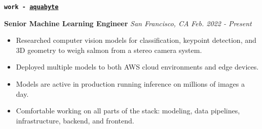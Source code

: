 \documentclass{article}[14pt]
\newenvironment{cvsection}[2] {
  \begin{tcolorbox}[
    standard jigsaw, %
    opacityback=0,   %
    top=0mm,         %
    bottom=0mm,      %
    boxrule=0pt,     %
    enhanced,        %
    frame code={
      \path[draw=#2,line width=3pt]
        (frame.south west) --
        ([yshift=-0.29cm] frame.north west) --
        ([yshift=-0.29cm, xshift=0.2\linewidth] frame.north west);
    }
  ]
  \hspace{0.20\linewidth}
  \textbf{\texttt{\Large{#1}}}
  \large
  \vspace{5pt}
  \newline
}
{ \end{tcolorbox} }
\newenvironment{tightemize}
{\vspace{-2pt}\begin{itemize}[leftmargin=*]\itemsep4pt \parskip0pt \parsep0pt}
{\end{itemize}}
\newcommand{\header}[1]{{\large\textbf{#1}}\newline}
\newcommand{\locationdate}[2]{\textit{#1} \hfill \textit{#2}}
\begin{document}
\vspace{1pt}
\begin{cvsection}{work - \href{https://aquabyte.ai/}{aquabyte}}{C1}
  \header{ Senior Machine Learning Engineer }
  \locationdate{San Francisco, CA}{Feb. 2022 - Present}
  \begin{tightemize}
    \item Researched computer vision models for classification, keypoint detection, and
      3D geometry to weigh salmon from a stereo camera system.
    \item Deployed multiple models to both AWS cloud environments and edge devices.
    \item Models are active in production running inference on millions of images a day.
    \item Comfortable working on all parts of the stack: modeling, data pipelines, infrastructure, backend, and frontend.





  \end{tightemize}
\end{cvsection}
\end{document}
